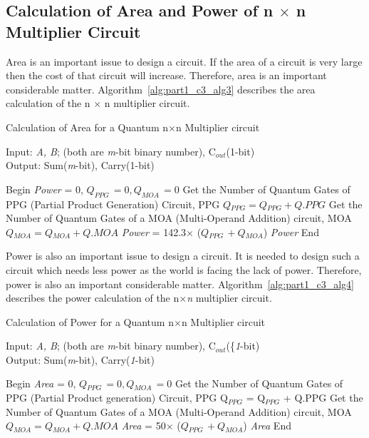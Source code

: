 \subsection{Calculation of Area and Power of {n ${\times}$ n} Multiplier Circuit}

Area is an important issue to design a circuit. If the area of a circuit is very large then the cost of that circuit will increase. Therefore, area is an important considerable matter. Algorithm~\ref{alg:part1_c3_alg3} describes the area calculation of the {n $\times$ n} multiplier circuit.

\begin{algorithm}[!h]
	\caption{Calculation of Area for a Quantum {n}$\times ${n} Multiplier circuit}
	\label{alg:part1_c3_alg3}
	Input: {\it A, B}; (both are {\it m}-bit binary number), C${}_{out}$(1-bit)\\
	Output: {{Sum({\it m}-bit), Carry({1}-bit)}}
	\begin{algorithmic}[1]
		
		\STATE Begin
		\STATE \textit{Power} = 0, $Q_{PPG\ }= 0, Q_{MOA\ }= 0$
		\STATE  Get the Number of Quantum Gates of   PPG (Partial Product Generation) Circuit,  PPG
		\STATE $Q{}_{PPG} = Q{}_{PPG} + Q.PPG$
		\ENDFOR
		\STATE Get the Number of Quantum Gates of a MOA (Multi-Operand Addition) circuit, MOA
		\STATE $Q{}_{MOA} = Q{}_{MOA} + Q.MOA$
		\ENDFOR
		\STATE \textit{Power} = 142.3\textit{$\times $} ($Q{}_{PPG\ }+Q{}_{MOA}$)
		\RETURN \textit{Power}
		\STATE End
	\end{algorithmic}
\end{algorithm}

Power is also an important issue to design a circuit. It is needed to design such a circuit which needs less power as the world is facing the lack of power. Therefore, power is also an important considerable matter. Algorithm~\ref{alg:part1_c3_alg4} describes the power calculation of the {n}$\times $\textit{n} multiplier circuit.

\begin{algorithm}[!h]
	\caption{Calculation of Power for a Quantum {n}$\times ${n} Multiplier circuit}
	\label{alg:part1_c3_alg4}
	Input: { {\it A, B}; (both are {\it m}-bit binary number), C${}_{out}$(\{\it1}-bit)\\
	Output: { { Sum({\it m}-bit), Carry({\it 1}-bit)}}
	\begin{algorithmic}[1]
		
		\STATE Begin
		\STATE \textit{Area} = 0, $Q{}_{PPG\ }= 0, Q{}_{MOA\ }= 0$
		\FOR{\textit{i} =1 \TO \textit{}n}
		\STATE  Get the Number of Quantum Gates of   PPG (Partial Product generation) Circuit,  PPG
		\STATE Q${}_{PPG}$ = Q${}_{PPG}$ + Q.PPG
		\ENDFOR
		\FOR{\textit{i} =1 \TO \textit{n}}
		\STATE Get the Number of Quantum Gates of a MOA (Multi-Operand Addition) circuit, MOA
		\STATE $Q{}_{MOA} = Q{}_{MOA} + Q.MOA$
		\ENDFOR
		\STATE \textit{Area} = 50\textit{$\times $} ($Q{}_{PPG\ }+Q{}_{MOA}$)
		\RETURN \textit{Area}
		\STATE End
	\end{algorithmic}
\end{algorithm}

